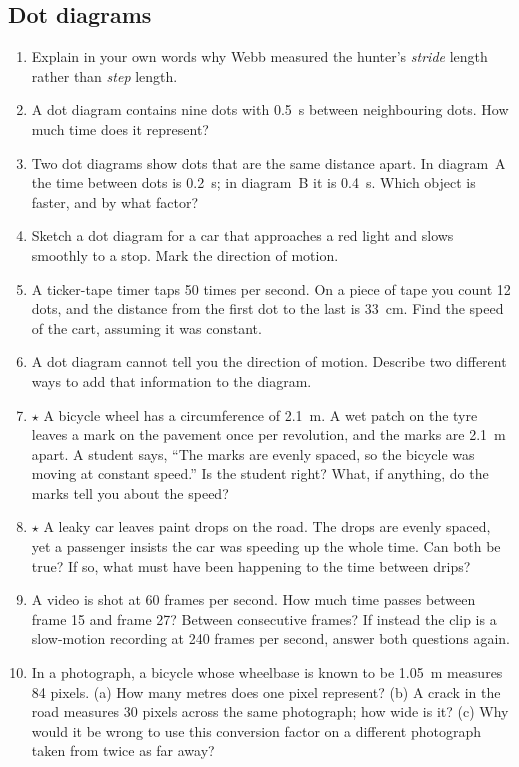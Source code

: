 \documentclass[11pt,twoside,openany]{book}
\begin{document}
\subsection*{Dot diagrams}
\begin{enumerate}[label=\textbf{\thechapter.\arabic*},series=exercises,leftmargin=*]
  \item Explain in your own words why Webb measured the hunter's \emph{stride} length rather than \emph{step} length.
  \item A dot diagram contains nine dots with \SI{0.5}{\second} between neighbouring dots. How much time does it represent?
  \item Two dot diagrams show dots that are the same distance apart. In diagram~A the time between dots is \SI{0.2}{\second}; in diagram~B it is \SI{0.4}{\second}. Which object is faster, and by what factor?
  \item Sketch a dot diagram for a car that approaches a red light and slows smoothly to a stop. Mark the direction of motion.
  \item A ticker-tape timer taps \num{50} times per second. On a piece of tape you count \num{12} dots, and the distance from the first dot to the last is \SI{33}{\centi\metre}. Find the speed of the cart, assuming it was constant.
  \item A dot diagram cannot tell you the direction of motion. Describe two different ways to add that information to the diagram.
  \item $\star$ A bicycle wheel has a circumference of \SI{2.1}{\metre}. A wet patch on the tyre leaves a mark on the pavement once per revolution, and the marks are \SI{2.1}{\metre} apart. A student says, ``The marks are evenly spaced, so the bicycle was moving at constant speed.'' Is the student right? What, if anything, do the marks tell you about the speed?
  \item $\star$ A leaky car leaves paint drops on the road. The drops are evenly spaced, yet a passenger insists the car was speeding up the whole time. Can both be true? If so, what must have been happening to the time between drips?
  \item A video is shot at \num{60} frames per second. How much time passes between frame \num{15} and frame \num{27}? Between consecutive frames? If instead the clip is a slow-motion recording at \num{240} frames per second, answer both questions again.
  \item In a photograph, a bicycle whose wheelbase is known to be \SI{1.05}{\metre} measures \num{84} pixels. (a) How many metres does one pixel represent? (b) A crack in the road measures \num{30} pixels across the same photograph; how wide is it? (c) Why would it be wrong to use this conversion factor on a different photograph taken from twice as far away?

\end{enumerate}
\end{document}
